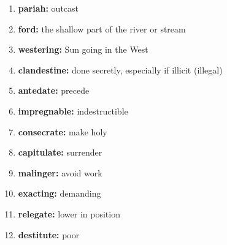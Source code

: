 \documentclass{article}
\begin{document}
\begin{enumerate}
    \item \textbf{pariah: }{outcast}
    \item \textbf{ford: }{the shallow part of the river or stream}
    \item \textbf{westering: }{Sun going in the West}
    \item \textbf{clandestine: }{done secretly, especially if illicit (illegal)}
    \item \textbf{antedate: }{precede}
    \item \textbf{impregnable: }{indestructible}
    \item \textbf{consecrate: }{make holy}
    \item \textbf{capitulate: }{surrender}
    \item \textbf{malinger: }{avoid work}
    \item \textbf{exacting: }{demanding}
    \item \textbf{relegate: }{lower in position}
    \item \textbf{destitute: }{poor}
    
\end{enumerate}
\end{document}
